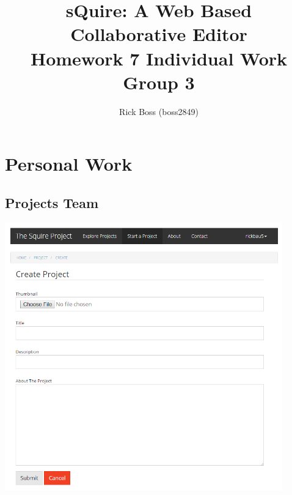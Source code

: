 \documentclass[11pt]{report}
\title{sQuire: A Web Based Collaborative Editor\\Homework 7 Individual Work\\Group 3}
\author{Rick Boss (boss2849)}
\begin{document}
\maketitle

\chapter{Personal Work}
\section{Projects Team}
    \includegraphics[width=0.9\textwidth]{images/project}
    \\
\end{document}
